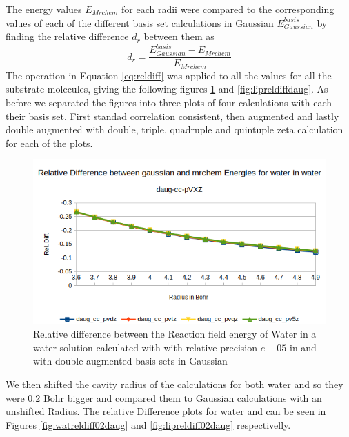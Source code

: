 \documentclass[../master_thesis.tex]{subfiles}
\begin{document}
The \mrchem energy values $E_{Mrchem}$ for each radii were compared to the
corresponding values of each of the different basis set calculations in
Gaussian  $E_{Gaussian}^{basis}$ by finding the relative difference $d_r$
between them as
\begin{equation}\label{eq:reldiff}
  d_r = \frac{E_{Gaussian}^{basis} - E_{Mrchem}}{E_{Mrchem}}
\end{equation}
The operation in Equation \ref{eq:reldiff} was applied to all the values for all the
substrate molecules, giving the following figures \ref{fig:watreldiffdaug} and \ref{fig:lipreldiffdaug}.
As before we separated the figures into three plots of four calculations with each
their basis set. First standad correlation consistent, then augmented and lastly double augmented
with double, triple, quadruple and quintuple zeta calculation for each of the plots.

\begin{figure}[h!]
  \centering
    \includegraphics[width=\linewidth]{img/watdaugreldiff.png}
  \caption{Relative difference between the Reaction field energy of Water in a water solution calculated with with relative precision $e-05$ in \mrchem
   and with double augmented basis sets in Gaussian}
  \label{fig:watreldiffdaug}
\end{figure}



We then shifted the cavity radius of the \mrchem calculations for both water and
 so they were $0.2$ Bohr bigger and compared them to Gaussian calculations
with an unshifted Radius. The relative Difference plots for water and  can be seen
in Figures \ref{fig:watreldiff02daug} and \ref{fig:lipreldiff02daug} respectivelly.
\end{document}
